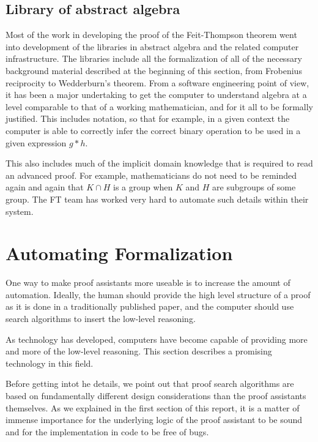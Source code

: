 \documentclass[brochure,english,12pt]{bourbaki}
\theoremstyle{plain}
\begin{document}
\subsection{Library of abstract algebra}

Most of the work in developing the proof of the Feit-Thompson theorem went into development of the libraries in
abstract algebra and the related computer infrastructure.  The libraries include all the formalization of all
of the necessary background material described at the beginning of this section, from Frobenius reciprocity
 to Wedderburn's theorem.  From a software engineering point of view, it has
been a major undertaking to get the computer to understand algebra at a level
comparable to that of a working mathematician, and for it all to be formally
justified.  This includes notation, so that for example,  in a 
given context the computer is able to correctly infer the correct binary operation 
to be used in a given expression $g*h$.  

This also includes much of the implicit domain knowledge that is required to
read an advanced proof.
For example, mathematicians do not need to be reminded again and again that $K \cap H$ is a group when
$K$ and $H$ are subgroups of some group.  The FT team has worked very hard
to automate such details within their system.



\section{Automating Formalization}

One way to make proof assistants more useable is to increase the amount of
automation.   Ideally, the human should provide the high level structure of a proof
as it is done in a traditionally published paper, and the computer should use
search algorithms to insert the low-level reasoning.   

As technology has developed, computers have become capable of providing
more and more of the low-level reasoning.   This section describes a 
 promising technology in this field.

Before getting intot he details, we point out that proof search algorithms
are based on fundamentally different design considerations than the proof
assistants themselves.  As we explained in the first section of this report, it is a matter of
immense importance for the underlying logic of the proof assistant to be sound
and for the implementation in code to be free of bugs.  
\end{document}
